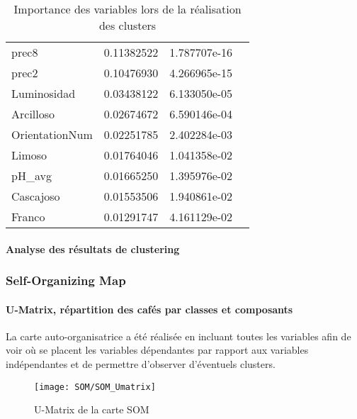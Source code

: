 \begin{table}[H]
\begin{tabular}{llll}
		prec8          & 0.11382522 & 1.787707e-16  \\
		prec2          & 0.10476930 & 4.266965e-15  \\
		Luminosidad    & 0.03438122 & 6.133050e-05  \\
		Arcilloso      & 0.02674672 & 6.590146e-04  \\
		OrientationNum & 0.02251785 & 2.402284e-03  \\
		Limoso         & 0.01764046 & 1.041358e-02  \\
		pH\_avg        & 0.01665250 & 1.395976e-02  \\
		Cascajoso      & 0.01553506 & 1.940861e-02  \\
		Franco         & 0.01291747 & 4.161129e-02 
	\end{tabular}
	\caption{Importance des variables lors de la réalisation des clusters}
\end{table}






\paragraph{Analyse des résultats de clustering}























\newpage
\subsubsection{Self-Organizing Map}\label{SOM}

\paragraph{U-Matrix, répartition des cafés par classes et composants} 
La carte auto-organisatrice a été réalisée en incluant toutes les variables afin de voir où se placent les variables dépendantes par rapport aux variables indépendantes et de permettre d'observer d'éventuels clusters. 


\begin{figure}[H]
	\centering
	\texttt{[image: SOM/SOM\_Umatrix]}
	\caption{U-Matrix de la carte SOM}
	\label{}
\end{figure}

